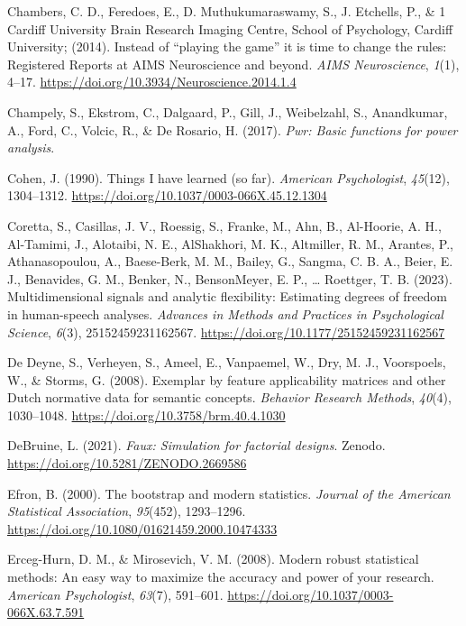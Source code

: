 \documentclass[
  man]{apa7}
\newlength{\cslhangindent}
\newenvironment{CSLReferences}[2] %
 {\begin{list}{}{%
  \setlength{\itemindent}{0pt}
  \setlength{\leftmargin}{0pt}
  \setlength{\parsep}{0pt}
  \ifodd #1
   \setlength{\leftmargin}{\cslhangindent}
   \setlength{\itemindent}{-1\cslhangindent}
  \fi
  \setlength{\itemsep}{#2\baselineskip}}}
 {\end{list}}
\begin{document}
\begin{CSLReferences}{1}{0}
Chambers, C. D., Feredoes, E., D. Muthukumaraswamy, S., J. Etchells, P., \& 1 Cardiff University Brain Research Imaging Centre, School of Psychology, Cardiff University; (2014). Instead of {``}playing the game{''} it is time to change the rules: Registered Reports at AIMS Neuroscience and beyond. \emph{AIMS Neuroscience}, \emph{1}(1), 4--17. \url{https://doi.org/10.3934/Neuroscience.2014.1.4}

Champely, S., Ekstrom, C., Dalgaard, P., Gill, J., Weibelzahl, S., Anandkumar, A., Ford, C., Volcic, R., \& De Rosario, H. (2017). \emph{Pwr: Basic functions for power analysis}.

Cohen, J. (1990). Things I have learned (so far). \emph{American Psychologist}, \emph{45}(12), 1304--1312. \url{https://doi.org/10.1037/0003-066X.45.12.1304}

Coretta, S., Casillas, J. V., Roessig, S., Franke, M., Ahn, B., Al-Hoorie, A. H., Al-Tamimi, J., Alotaibi, N. E., AlShakhori, M. K., Altmiller, R. M., Arantes, P., Athanasopoulou, A., Baese-Berk, M. M., Bailey, G., Sangma, C. B. A., Beier, E. J., Benavides, G. M., Benker, N., BensonMeyer, E. P., \ldots{} Roettger, T. B. (2023). Multidimensional signals and analytic flexibility: Estimating degrees of freedom in human-speech analyses. \emph{Advances in Methods and Practices in Psychological Science}, \emph{6}(3), 25152459231162567. \url{https://doi.org/10.1177/25152459231162567}

De Deyne, S., Verheyen, S., Ameel, E., Vanpaemel, W., Dry, M. J., Voorspoels, W., \& Storms, G. (2008). Exemplar by feature applicability matrices and other Dutch normative data for semantic concepts. \emph{Behavior Research Methods}, \emph{40}(4), 1030--1048. \url{https://doi.org/10.3758/brm.40.4.1030}

DeBruine, L. (2021). \emph{Faux: Simulation for factorial designs}. Zenodo. \url{https://doi.org/10.5281/ZENODO.2669586}

Efron, B. (2000). The bootstrap and modern statistics. \emph{Journal of the American Statistical Association}, \emph{95}(452), 1293--1296. \url{https://doi.org/10.1080/01621459.2000.10474333}

Erceg-Hurn, D. M., \& Mirosevich, V. M. (2008). Modern robust statistical methods: An easy way to maximize the accuracy and power of your research. \emph{American Psychologist}, \emph{63}(7), 591--601. \url{https://doi.org/10.1037/0003-066X.63.7.591}


\end{CSLReferences}
\end{document}
